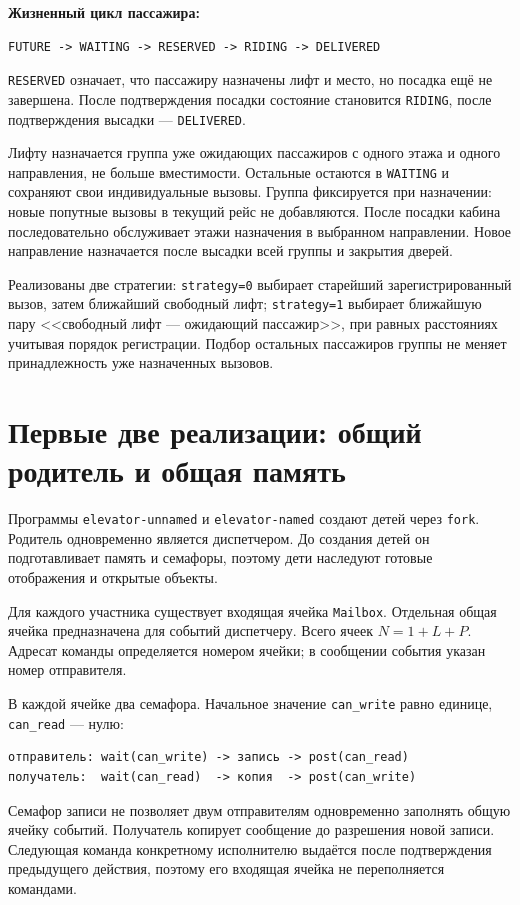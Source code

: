 \documentclass[12pt,a4paper]{article}
\begin{document}
\textbf{Жизненный цикл пассажира:}
\begin{verbatim}
FUTURE -> WAITING -> RESERVED -> RIDING -> DELIVERED
\end{verbatim}
\verb|RESERVED| означает, что пассажиру назначены лифт и место, но
посадка ещё не завершена. После подтверждения посадки состояние
становится \verb|RIDING|, после подтверждения высадки ---
\verb|DELIVERED|.

Лифту назначается группа уже ожидающих пассажиров с одного этажа и
одного направления, не больше вместимости. Остальные остаются в
\verb|WAITING| и сохраняют свои индивидуальные вызовы. Группа фиксируется
при назначении: новые попутные вызовы в текущий рейс не добавляются.
После посадки кабина последовательно обслуживает этажи назначения
в выбранном направлении. Новое направление назначается после высадки
всей группы и закрытия дверей.

Реализованы две стратегии: \verb|strategy=0| выбирает старейший
зарегистрированный вызов, затем ближайший свободный лифт;
\verb|strategy=1| выбирает ближайшую пару <<свободный лифт --- ожидающий
пассажир>>, при равных расстояниях учитывая порядок регистрации.
Подбор остальных пассажиров группы не меняет принадлежность уже
назначенных вызовов.

\section{Первые две реализации: общий родитель и общая память}

Программы \verb|elevator-unnamed| и \verb|elevator-named| создают детей
через \verb|fork|. Родитель одновременно является диспетчером. До
создания детей он подготавливает память и семафоры, поэтому дети
наследуют готовые отображения и открытые объекты.

Для каждого участника существует входящая ячейка \verb|Mailbox|.
Отдельная общая ячейка предназначена для событий диспетчеру.
Всего ячеек $N=1+L+P$. Адресат команды определяется номером ячейки;
в сообщении события указан номер отправителя.

В каждой ячейке два семафора. Начальное значение \verb|can_write|
равно единице, \verb|can_read| --- нулю:
\begin{verbatim}
отправитель: wait(can_write) -> запись -> post(can_read)
получатель:  wait(can_read)  -> копия  -> post(can_write)
\end{verbatim}
Семафор записи не позволяет двум отправителям одновременно заполнять
общую ячейку событий. Получатель копирует сообщение до разрешения новой
записи. Следующая команда конкретному исполнителю выдаётся после
подтверждения предыдущего действия, поэтому его входящая ячейка не
переполняется командами.
\end{document}
